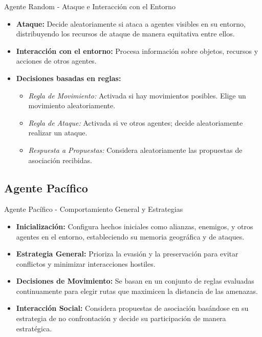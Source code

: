 \documentclass{beamer}
\begin{document}
\begin{frame}{Agente Random - Ataque e Interacción con el Entorno}
  \begin{itemize}
    \item \textbf{Ataque:} Decide aleatoriamente si ataca a agentes visibles en su entorno, distribuyendo los recursos de ataque de manera equitativa entre ellos.
    \item \textbf{Interacción con el entorno:} Procesa información sobre objetos, recursos y acciones de otros agentes.
    \item \textbf{Decisiones basadas en reglas:}
          \begin{itemize}
            \item \textit{Regla de Movimiento:} Activada si hay movimientos posibles. Elige un movimiento aleatoriamente.
            \item \textit{Regla de Ataque:} Activada si ve otros agentes; decide aleatoriamente realizar un ataque.
            \item \textit{Respuesta a Propuestas:} Considera aleatoriamente las propuestas de asociación recibidas.
          \end{itemize}
  \end{itemize}
\end{frame}

\subsection{Agente Pacífico}
\begin{frame}{Agente Pacífico - Comportamiento General y Estrategias}
  \begin{itemize}
    \item \textbf{Inicialización:} Configura hechos iniciales como alianzas, enemigos, y otros agentes en el entorno, estableciendo su memoria geográfica y de ataques.
    \item \textbf{Estrategia General:} Prioriza la evasión y la preservación para evitar conflictos y minimizar interacciones hostiles.
    \item \textbf{Decisiones de Movimiento:} Se basan en un conjunto de reglas evaluadas continuamente para elegir rutas que maximicen la distancia de las amenazas.
    \item \textbf{Interacción Social:} Considera propuestas de asociación basándose en su estrategia de no confrontación y decide su participación de manera estratégica.
  \end{itemize}
\end{frame}
\end{document}
